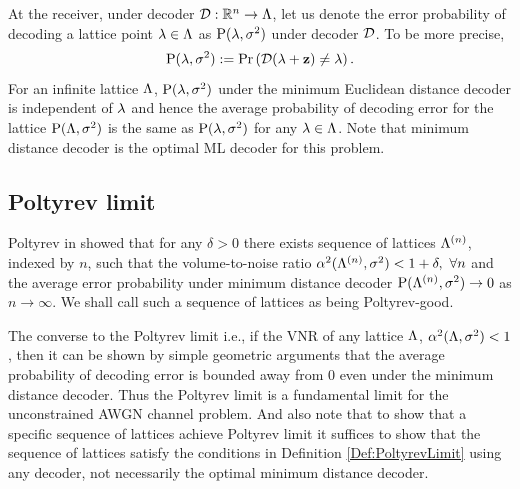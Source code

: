 At the receiver, under decoder $\mathcal{D}:\mathbb{R}^{n}\rightarrow\Lambda$, let us denote the error probability of decoding a lattice point $\lambda\in\Lambda$ as $\text{P}(\mathbf{\lambda},\sigma^{2})$ under decoder $\mathcal{D}$. To be more precise,  %
\begin{equation*}
 \text{P}(\mathbf{\lambda},\sigma^{2}):=\mathrm{Pr}\left(\mathcal{D}(\mathbf{\lambda}+\mathbf{z})\neq  \lambda\right).
\end{equation*}
For an infinite lattice $\Lambda$, $\text{P}(\lambda,\sigma^{2})$ under the minimum Euclidean distance decoder is independent of $\lambda$ and hence the average probability of decoding error for the lattice  $\text{P}(\Lambda,\sigma^{2})$ is the same as $\text{P}(\lambda,\sigma^{2})$ for any $\lambda\in \Lambda$. Note that minimum distance decoder is the optimal ML decoder for this problem.

\subsection{Poltyrev limit}
\begin{definition}\label{Def:PoltyrevLimit}
Poltyrev in \cite{poltyrev94} showed that for any $\delta>0$ there exists sequence of lattices $\Lambda^{(n)}$, indexed by $n$, such that the volume-to-noise ratio $\alpha^{2}(\Lambda^{(n)},\sigma^{2})<1+\delta,~ \forall n$ and the average error probability under minimum distance decoder $\text{P}(\Lambda^{(n)},\sigma^{2}) \rightarrow 0$ as $n \rightarrow \infty$. We shall call such a sequence of lattices as being Poltyrev-good.
\end{definition}
\begin{remark}
The converse to the Poltyrev limit i.e., if the VNR of any lattice $\Lambda$, $\alpha^{2}(\Lambda,\sigma^{2})<1$, then it can be shown by simple geometric arguments that the average probability of decoding error is bounded away from $0$ even under the minimum distance decoder. Thus the Poltyrev limit is a fundamental limit for the unconstrained AWGN channel problem. And also note that to show that a specific sequence of lattices achieve Poltyrev limit it suffices to show that the sequence of lattices satisfy the conditions in Definition \ref{Def:PoltyrevLimit} using any decoder, not necessarily the optimal minimum distance decoder.
\end{remark}
